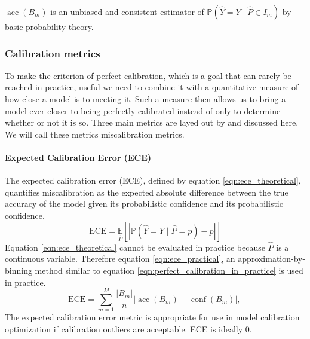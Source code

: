 $\operatorname{acc}\left(B_{m}\right)$ is an unbiased and consistent estimator of $\mathbb{P}\left(\hat{Y}=Y \mid \hat{P} \in I_{m}\right)$ by basic probability theory.

\subsubsection{Calibration metrics}
To make the criterion of perfect calibration, which is a goal that can rarely be reached in practice, useful we need to combine it with a quantitative measure of how close a model is to meeting it. Such a measure then allows us to bring a model ever closer to being perfectly calibrated instead of only to determine whether or not it is so. Three main metrics are layed out by \cite{guo2017calibration} and discussed here. We will call these metrics miscalibration metrics.

\paragraph{Expected Calibration Error (ECE)}
The expected calibration error (ECE), defined by equation \ref{eqn:ece_theoretical}, quantifies miscalibration as the expected absolute difference between the true accuracy of the model given its probabilistic confidence and its probabilistic confidence.
\begin{equation}
  \label{eqn:ece_theoretical}
  \mathrm{ECE}=\underset{\hat{P}}{\mathbb{E}}[|\mathbb{P}(\hat{Y}=Y \mid \hat{P}=p)-p|]
\end{equation}
Equation \ref{eqn:ece_theoretical} cannot be evaluated in practice because $\hat{P}$ is a continuous variable. Therefore equation \ref{eqn:ece_practical}, an approximation-by-binning method similar to equation \ref{eqn:perfect_calibration_in_practice} is used in practice.
\begin{equation}
  \label{eqn:ece_practical}
  \mathrm{ECE}=\sum_{m=1}^{M} \frac{\left|B_{m}\right|}{n}\left|\operatorname{acc}\left(B_{m}\right)-\operatorname{conf}\left(B_{m}\right)\right| \text {, }
\end{equation}
The expected calibration error metric is appropriate for use in model calibration optimization if calibration outliers are acceptable. ECE is ideally 0.

